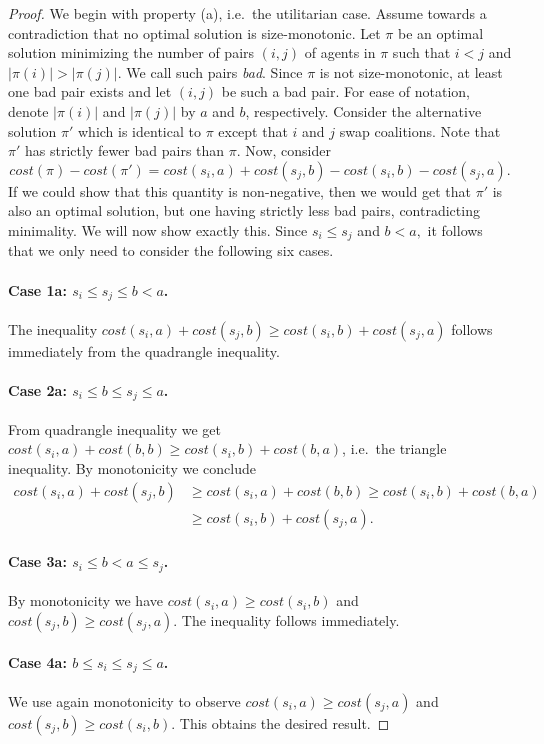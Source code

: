 \documentclass[a4paper,UKenglish,cleveref, autoref, thm-restate]{lipics-v2021}
\newcommand{\cost}{\mathit{cost}}
\begin{document}
\sizemonotonicity*
\begin{proof} 
We begin with property (a), i.e.\ the utilitarian case. Assume towards a contradiction that no optimal solution is size-monotonic. Let $\pi$ be an optimal solution minimizing the number of pairs $(i, j)$ of agents in $\pi$ such that $i < j$ and $|\pi(i)| > |\pi(j)|$. We call such pairs \emph{bad}. Since $\pi$ is not size-monotonic, at least one bad pair exists and let $(i, j)$ be such a bad pair. For ease of notation, denote $|\pi(i)|$ and $|\pi(j)|$ by $a$ and $b$, respectively. Consider the alternative solution $\pi'$ which is identical to $\pi$ except that $i$ and $j$ swap coalitions. Note that $\pi'$ has strictly fewer bad pairs than $\pi.$
Now, consider
\[
\cost(\pi) - \cost(\pi') = \cost(s_i,a) + \cost(s_j,b) - \cost(s_i, b) - \cost(s_j,a).
\] 
If we could show that this quantity is non-negative, then we would get that $\pi'$ is also an optimal solution, but one having strictly less bad pairs, contradicting minimality. We will now show exactly this. Since $s_i \leq s_j$ and $b < a,$ it follows that we only need to consider the following six cases.

\paragraph*{Case 1a: $s_i \leq s_j \leq b < a$.}
 The inequality $\cost(s_i,a) + \cost(s_j,b) \geq \cost(s_i, b) + \cost(s_j,a)$ follows immediately from the quadrangle inequality.
\paragraph*{Case 2a: $s_i \leq b \leq s_j \leq a$.}
From quadrangle inequality we get $\cost(s_i,a) + \cost(b,b) \geq \cost(s_i,b) + \cost(b,a)$, i.e.\ the triangle inequality. By monotonicity we conclude
\begin{align*}
    \cost(s_i,a) + \cost(s_j,b) &\geq \cost(s_i,a) + \cost(b,b) \geq \cost(s_i,b) + \cost(b,a)\\
    &\geq \cost(s_i,b) + \cost(s_j,a).
\end{align*}
\paragraph*{Case 3a: $s_i \leq b < a \leq s_j$.}
By monotonicity we have $\cost(s_i,a)\geq \cost(s_i,b)$ and $\cost(s_j,b) \geq \cost(s_j,a)$. The inequality follows immediately.
\paragraph*{Case 4a: $b \leq s_i \leq s_j \leq a$.}
We use again monotonicity to observe $\cost(s_i,a) \geq \cost(s_j,a)$ and $\cost(s_j,b) \geq \cost(s_i,b)$. This obtains the desired result.

\end{proof}
\end{document}
